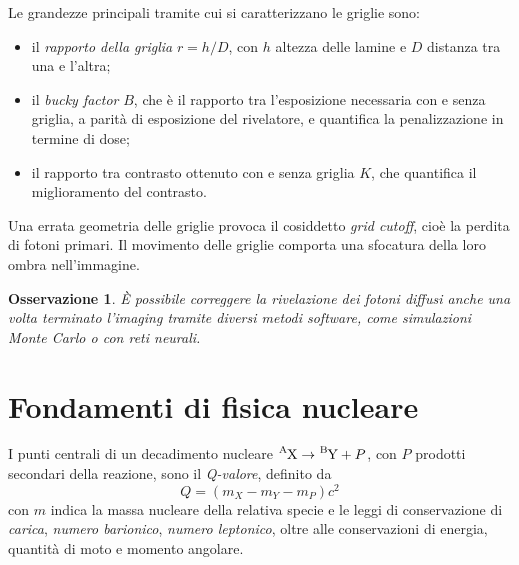 \documentclass[11pt, a4paper]{scrartcl}
\theoremstyle{style}
\newtheorem{osservazione}{Osservazione}[section]
\theoremstyle{style1}
\numberwithin{equation}{subsection}
\begin{document}
\begin{center}
\begin{minipage}
	\end{minipage}
\end{center}
Le grandezze principali tramite cui si caratterizzano le griglie sono:
\begin{itemize}
	\item il \textit{rapporto della griglia} $r = h / D$, con $h$ altezza delle lamine e $D$ distanza tra una e l'altra;
	\item il \textit{bucky factor} $B$, che \`e il rapporto tra l'esposizione necessaria con e senza griglia, a parit\`a di esposizione del rivelatore, e quantifica la penalizzazione in termine di dose;
	\item il rapporto tra contrasto ottenuto con e senza griglia $K$, che quantifica il miglioramento del contrasto.
\end{itemize}
Una errata geometria delle griglie provoca il cosiddetto \textit{grid cutoff}, cio\`e la perdita di fotoni primari.
Il movimento delle griglie comporta una sfocatura della loro ombra nell'immagine.

\begin{osservazione}
\`E possibile correggere la rivelazione dei fotoni diffusi anche una volta terminato l'imaging tramite diversi metodi software, come simulazioni Monte Carlo o con reti neurali.
\end{osservazione}

\newpage


\section{Fondamenti di fisica nucleare}
I punti centrali di un decadimento nucleare $\ce{^AX} \to \ce{^BY} + P$, con $P$ prodotti secondari della reazione, sono il \textit{Q-valore}, definito da 
\begin{equation}
	Q = (m_X - m_Y - m_P ) c^2
\end{equation}
con $m$ indica la massa nucleare della relativa specie e le leggi di conservazione di \textit{carica}, \textit{numero barionico}, \textit{numero leptonico}, oltre alle conservazioni di energia, quantit\`a di moto e momento angolare.
\end{document}
